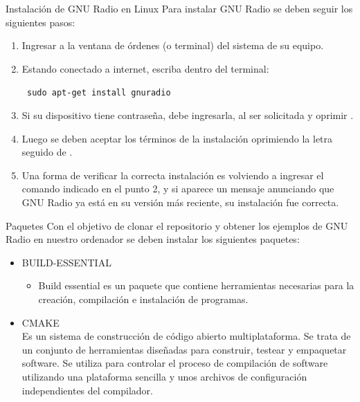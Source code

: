 \begin{frame}{Instalación de GNU Radio en Linux}
{Para instalar GNU Radio se deben seguir los siguientes pasos:}
\begin{enumerate}[1.]
\item Ingresar a la ventana de órdenes (o terminal) del sistema de su equipo.
\item Estando conectado a internet, escriba dentro del terminal:

  \begin{block}{}
  \texttt{
    sudo apt-get install gnuradio}
  \end{block}

\item Si su dispositivo tiene contrase\~na, debe ingresarla, al ser solicitada y oprimir \keys{\return}. 
\item Luego se deben aceptar los términos de la instalación oprimiendo la letra  seguido de \keys{\return}. 
\item Una forma de verificar la correcta instalación es volviendo a ingresar el comando indicado en el punto 2, y si aparece un mensaje anunciando que GNU Radio ya está en su versión más reciente, su instalación fue correcta.
\end{enumerate}
\end{frame}

\begin{frame}{Paquetes}
Con el objetivo de clonar el repositorio y obtener los ejemplos de GNU Radio en nuestro ordenador se deben instalar los siguientes paquetes: 
  \begin{itemize}
  \item {BUILD-ESSENTIAL\\}
    \begin{itemize}
    \item
    {Build essential es un paquete que contiene herramientas necesarias
    para la creación, compilación e instalación de programas.}
    \end{itemize}
  \item {CMAKE\\}
  {Es un sistema de construcción de código abierto multiplataforma. Se trata de  un conjunto de herramientas diseñadas para construir, testear y empaquetar software. Se utiliza para controlar el proceso de compilación de software utilizando una plataforma sencilla y unos archivos de configuración
independientes del compilador.}
  \end{itemize}
\end{frame}


